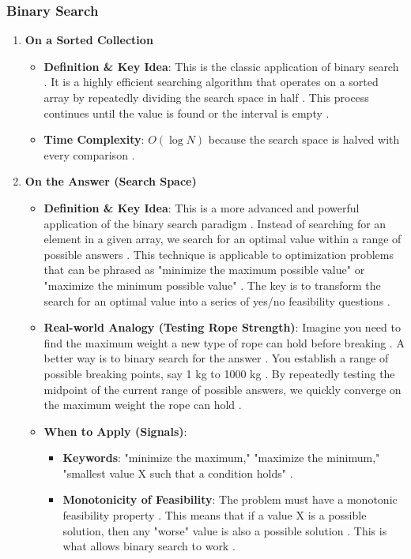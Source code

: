 \documentclass{article}
\begin{document}
\subsubsection{Binary Search}
\begin{enumerate}
\item \textbf{On a Sorted Collection}
\begin{itemize}
\item \textbf{Definition \& Key Idea}: This is the classic application of binary search \cite{502}. It is a highly efficient searching algorithm that operates on a sorted array by repeatedly dividing the search space in half \cite{503}. This process continues until the value is found or the interval is empty \cite{505}.
\item \textbf{Time Complexity}: $O(\log N)$ because the search space is halved with every comparison \cite{511}.
\end{itemize}
\item \textbf{On the Answer (Search Space)}
\begin{itemize}
\item \textbf{Definition \& Key Idea}: This is a more advanced and powerful application of the binary search paradigm \cite{514}. Instead of searching for an element in a given array, we search for an optimal value within a range of possible answers \cite{515}. This technique is applicable to optimization problems that can be phrased as "minimize the maximum possible value" or "maximize the minimum possible value" \cite{516}. The key is to transform the search for an optimal value into a series of yes/no feasibility questions \cite{517}.
\item \textbf{Real-world Analogy (Testing Rope Strength)}: Imagine you need to find the maximum weight a new type of rope can hold before breaking \cite{518}. A better way is to binary search for the answer \cite{520}. You establish a range of possible breaking points, say 1 kg to 1000 kg \cite{521}. By repeatedly testing the midpoint of the current range of possible answers, we quickly converge on the maximum weight the rope can hold \cite{528}.
\item \textbf{When to Apply (Signals)}:
\begin{itemize}
\item \textbf{Keywords}: "minimize the maximum," "maximize the minimum," "smallest value X such that a condition holds" \cite{532}.
\item \textbf{Monotonicity of Feasibility}: The problem must have a monotonic feasibility property \cite{533}. This means that if a value X is a possible solution, then any "worse" value is also a possible solution \cite{534}. This is what allows binary search to work \cite{536}.
\end{itemize}
\end{itemize}
\end{enumerate}
\end{document}
